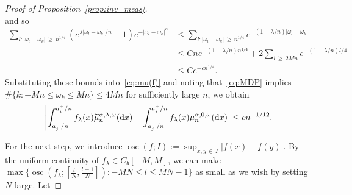 \documentclass[10pt]{amsart}
\theoremstyle{definition}\newtheorem{defi}[theo]{Definition}\newtheorem{rema}[theo]{Remark}\newtheorem{exam}[theo]{Example}\newtheorem{exem}[theo]{Example}\newtheorem{nota}[theo]{Notation}
\DeclareMathOperator*{\osc}{osc}
\newcommand{\dd}{\text{\upshape{d}}}
\let\oldtilde\tilde
\renewcommand*{\tilde}[1]{\mathchoice{\widetilde{#1}}{\widetilde{#1}}{\oldtilde{#1}}{\oldtilde{#1}}}
\begin{document}
\begin{proof}[Proof of Proposition~\ref{prop:inv_meas}]
\[\]
and so
\begin{align*}
\sum_{l\colon |\omega_l-\omega_k|\,\ge\,n^{1/4}}\left(e^{\lambda|\omega_l-\omega_k|/n}-1\right)e^{-|\omega_l-\omega_k|^\alpha} &\le \sum_{l\colon |\omega_l-\omega_k|\,\ge\,n^{1/4}}e^{-(1-\lambda/n)|\omega_l-\omega_k|}\\
&\le Cn e^{-(1-\lambda/n)n^{1/4}}+2\sum_{l\,\geq\,2Mn}e^{-(1-\lambda/n)l/4}\\
&\leq C e^{-cn^{1/4}}.
\end{align*}
Substituting these bounds into~\eqref{eq:mu(f)} and noting that~\eqref{eq:MDP} implies $\#\{k\colon -Mn \le \omega_k \le Mn\} \le 4M n$ for sufficiently large $n$, we obtain
\begin{align}\label{eq:inv_meas1st}
\left|\int_{a_j^-/n}^{a_i^+/n} f_\lambda(x)\tilde{\mu}_n^{\alpha,\lambda,\omega}(\dd x) -\int_{a_j^-/n}^{a_i^+/n} f_\lambda(x)\mu_n^{\alpha,0,\omega}(\dd x)\right| \le c n^{-1/12}.
\end{align}

For the next step, we introduce $\osc(f;I) := \sup_{x,y\,\in\,I}|f(x)-f(y)|$. By the uniform continuity of $f_\lambda\in C_b[-M,M]$, we can make $\max\{\osc(f_\lambda;[\tfrac{l}{N}, \tfrac{l+1}{N}])\colon -MN\le l \le MN-1\}$ as small as we wish by setting $N$ large. Let


\end{proof}
\end{document}
